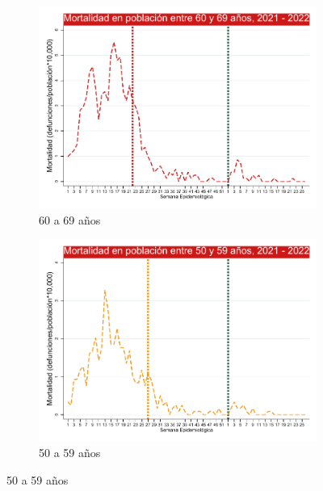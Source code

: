 \documentclass[12pt,a4paper,openany]{book}
\begin{document}
\begin{figure}[h]
		\vspace{10mm}
		\begin{subfigure}[b]{0.45\textwidth}
			\centering
			\includegraphics[width=\textwidth]{../figuras/mortalidad_edad_60.pdf}
			\caption{60 a 69 años}
		\end{subfigure}
		\hfill
		\begin{subfigure}[b]{0.45\textwidth}
			\centering
			\includegraphics[width=\textwidth]{../figuras/mortalidad_edad_50.pdf}
			\caption{50 a 59 años}
		\end{subfigure}
		

\end{figure}
\end{document}

